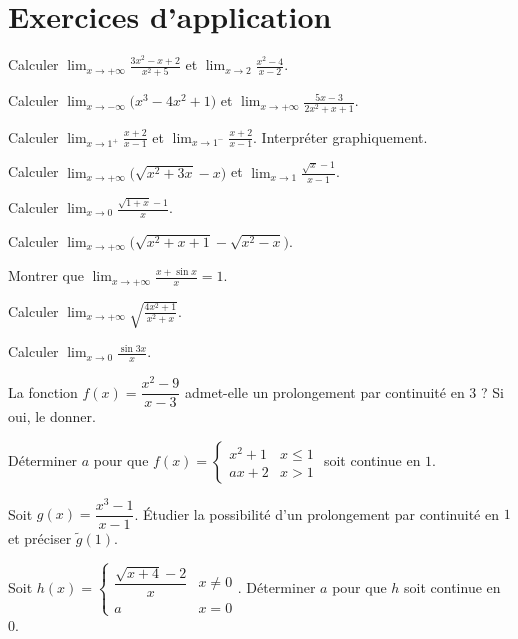 \section{Exercices d'application}

\exo{} Calculer $\displaystyle\lim_{x\to+\infty}\frac{3x^{2}-x+2}{x^{2}+5}$ et $\displaystyle\lim_{x\to2}\frac{x^{2}-4}{x-2}$.

\exo{} Calculer $\displaystyle\lim_{x\to-\infty}\big(x^{3}-4x^{2}+1\big)$ et $\displaystyle\lim_{x\to+\infty}\frac{5x-3}{2x^{2}+x+1}$.

\exo{} Calculer $\displaystyle\lim_{x\to1^{+}}\frac{x+2}{x-1}$ et $\displaystyle\lim_{x\to1^{-}}\frac{x+2}{x-1}$. Interpréter graphiquement.

\exo{} Calculer $\displaystyle\lim_{x\to+\infty}\big(\sqrt{x^{2}+3x}-x\big)$ et $\displaystyle\lim_{x\to1}\frac{\sqrt x-1}{x-1}$.

\exo{} Calculer $\displaystyle\lim_{x\to0}\frac{\sqrt{1+x}-1}{x}$.

\exo{} Calculer $\displaystyle\lim_{x\to+\infty}\big(\sqrt{x^{2}+x+1}-\sqrt{x^{2}-x}\big)$.

\exo{} Montrer que $\displaystyle\lim_{x\to+\infty}\frac{x+\sin x}{x}=1$.

\exo{} Calculer $\displaystyle\lim_{x\to+\infty}\sqrt{\frac{4x^{2}+1}{x^{2}+x}}$.

\exo{} Calculer $\displaystyle\lim_{x\to0}\frac{\sin 3x}{x}$.

\exo{} La fonction $f(x)=\dfrac{x^{2}-9}{x-3}$ admet-elle un prolongement par continuité en $3$ ? Si oui, le donner.

\exo{} Déterminer $a$ pour que $f(x)=\begin{cases}x^{2}+1&x\le1\\ ax+2&x>1\end{cases}$ soit continue en $1$.

\exo{} Soit $g(x)=\dfrac{x^{3}-1}{x-1}$. Étudier la possibilité d'un prolongement par continuité en $1$ et préciser $\tilde g(1)$.

\exo{} Soit $h(x)=\begin{cases}\dfrac{\sqrt{x+4}-2}{x}&x\neq0\\ a&x=0\end{cases}$. Déterminer $a$ pour que $h$ soit continue en $0$.

